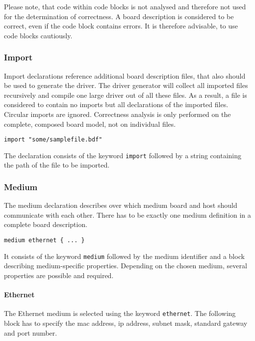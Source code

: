 \documentclass{report}
\begin{document}
Please note, that code within code blocks is not analysed and therefore not used for the determination of correctness. A board description is considered to be correct, even if the code block contains errors. It is therefore advisable, to use code blocks cautiously.

\subsubsection{Import}
Import declarations reference additional board description files, that also should be used to generate the driver. The driver generator will collect all imported files recursively and compile one large driver out of all these files. As a result, a file is considered to contain no imports but all declarations of the imported files. Circular imports are ignored. Correctness analysis is only performed on the complete, composed board model, not on individual files. 

\begin{lstlisting}[language=bdl]
import "some/samplefile.bdf"
\end{lstlisting}

The declaration consists of the keyword \texttt{import} followed by a string containing the path of the file to be imported.

\subsubsection{Medium}
The medium declaration describes over which medium board and host should communicate with each other. There has to be exactly one medium definition in a complete board description.

\begin{lstlisting}[language=bdl]
medium ethernet { ... }
\end{lstlisting}

It consists of the keyword \texttt{medium} followed by the medium identifier and a block describing medium-specific properties. Depending on the chosen medium, several properties are possible and required.

\paragraph{Ethernet}
The Ethernet medium is selected using the keyword \texttt{ethernet}. The following block has to specify the mac address, ip address, subnet mask, standard gateway and port number.
\end{document}
